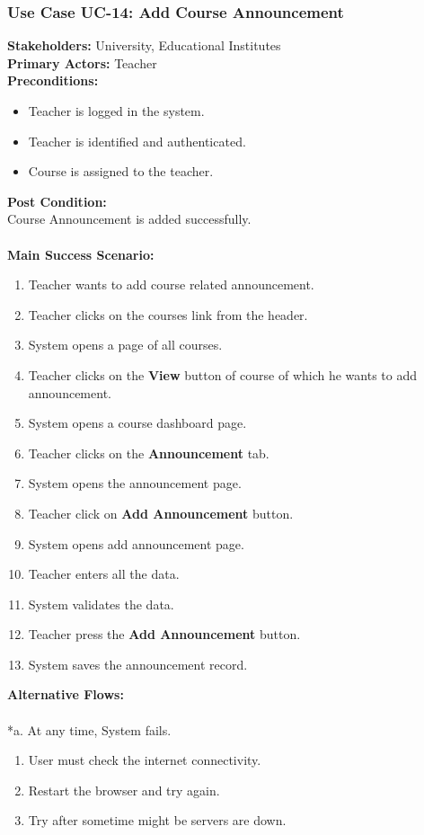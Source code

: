 \documentclass[12pt]{article}
\begin{document}
\subsubsection{Use Case UC-14: Add Course Announcement}
\textbf{Stakeholders: } University, Educational Institutes \\
\textbf{Primary Actors: }Teacher \\
\textbf{Preconditions:}
\begin{itemize}
\item Teacher is logged in the system.
\item Teacher is identified and authenticated.
\item Course is assigned to the teacher.
\end{itemize}
\textbf{Post Condition: }\\
Course Announcement is added successfully.\\
\\
\textbf{Main Success Scenario:}
\begin{enumerate}
\item Teacher wants to add course related announcement.
\item Teacher clicks on the courses link from the header.
\item System opens a page of all courses.
\item Teacher clicks on the \textbf{View} button of course of which he wants to add announcement.
\item System opens a course dashboard page.
\item Teacher clicks on the \textbf{Announcement} tab.
\item System opens the announcement page.
\item Teacher click on \textbf{Add Announcement} button.
\item System opens add announcement page.
\item Teacher enters all the data.
\item System validates the data.
\item Teacher press the \textbf{Add Announcement} button.
\item System saves the announcement record.
\end{enumerate}
\textbf{Alternative Flows:}\\
\\
*a. At any time, System fails.
\begin{enumerate}
\item User must check the internet connectivity.
\item Restart the browser and try again.
\item Try after sometime might be servers are down.
\end{enumerate}
\end{document}
